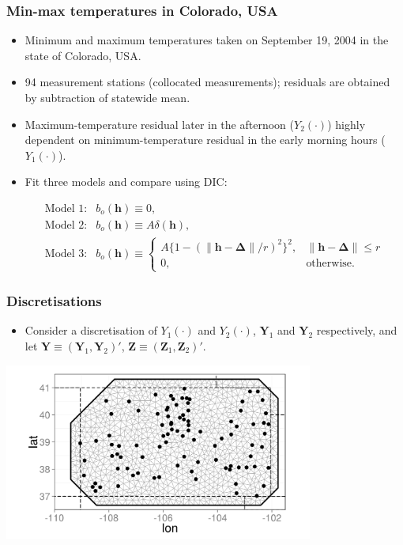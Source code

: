 \documentclass{beamer}
\newcommand{\Deltab} {\boldsymbol{\Delta}}
\newcommand{\h}{\mathbf{h}}
\newcommand{\Yvec}{\mathbf{Y}}
\newcommand{\Zvec}{\mathbf{Z}}
\begin{document}
\begin{frame}
\frametitle{Min-max temperatures in Colorado, USA}

\begin{itemize}
\item Minimum and maximum temperatures taken on September 19, 2004 in the state of Colorado, USA.
\item 94 measurement stations (collocated measurements); residuals are obtained by subtraction of statewide mean.
\item Maximum-temperature residual later in the afternoon ($Y_2(\cdot)$) highly dependent on minimum-temperature residual in the early morning hours ($Y_1(\cdot)$).
\item Fit three models and compare using DIC:

\begin{equation*}
\begin{array}{ll}
\textrm{Model 1:} &b_o(\h) \equiv 0, \\
\textrm{Model 2:} &b_o(\h) \equiv A\delta(\h), \\
\textrm{Model 3:} &b_o(\h) \equiv \left\{\begin{array}{ll} A\{1 - (\|\h - \Deltab\|/r)^2\}^2, & \| \h - \Deltab\| \le r \\ 0, & \textrm{otherwise}. \end{array} \right. 
\end{array}
\end{equation*}
\end{itemize}
\end{frame}


\begin{frame}
\frametitle{Discretisations}
\begin{itemize}
\item Consider a discretisation of $Y_1(\cdot)$ and $Y_2(\cdot)$, $\Yvec_1$ and $\Yvec_2$ respectively, and let $\Yvec \equiv (\Yvec_1,\Yvec_2)'$, $\Zvec \equiv (\Zvec_1,\Zvec_2)'$.
\end{itemize}

\vspace{-0.1in}
\begin{center}
\includegraphics[width=4in]{meshplot.png}
\end{center}

\end{frame}
\end{document}
